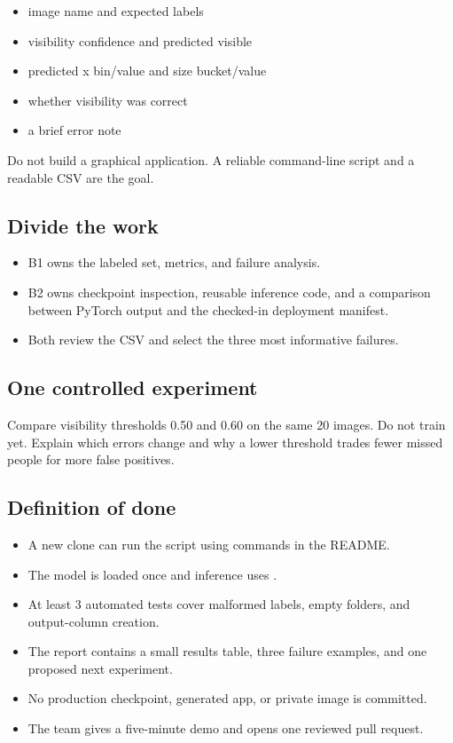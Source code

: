 \documentclass[11pt]{article}
\begin{document}
\begin{itemize}
\item image name and expected labels
\item visibility confidence and predicted visible
\item predicted x bin/value and size bucket/value
\item whether visibility was correct
\item a brief error note
\end{itemize}

Do not build a graphical application. A reliable command-line script and a readable CSV are the goal.

\subsection{Divide the work}

\begin{itemize}
\item B1 owns the labeled set, metrics, and failure analysis.
\item B2 owns checkpoint inspection, reusable inference code, and a comparison between PyTorch output and the checked-in deployment manifest.
\item Both review the CSV and select the three most informative failures.
\end{itemize}

\subsection{One controlled experiment}

Compare visibility thresholds 0.50 and 0.60 on the same 20 images. Do not train yet. Explain which errors change and why a lower threshold trades fewer missed people for more false positives.

\subsection{Definition of done}

\begin{itemize}
\item A new clone can run the script using commands in the README.
\item The model is loaded once and inference uses .
\item At least 3 automated tests cover malformed labels, empty folders, and output-column creation.
\item The report contains a small results table, three failure examples, and one proposed next experiment.
\item No production checkpoint, generated app, or private image is committed.
\item The team gives a five-minute demo and opens one reviewed pull request.
\end{itemize}
\end{document}
